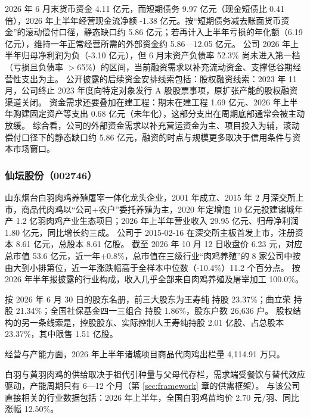  2026 年 6 月末货币资金 4.11 亿元，而短期债务 9.97 亿元（现金短债比 0.41 倍），2026 年上半年经营现金流净额 -1.38 亿元。按“短期债务减去账面货币资金”的滚动偿付口径，静态缺口约 5.86 亿元；若再计入上半年亏损的年化额（6.19 亿元），维持一年正常经营所需的外部资金约 5.86---12.05 亿元。 公司 2026 年上半年归母净利润为负（-3.10 亿元），但 6 月末资产负债率 52.3\% 尚未进入第一档（亏损且负债率 $>$65\%）的区间，当前融资需求以补充流动资金、支撑低谷期经营性支出为主。 公开披露的后续资金安排线索包括：股权融资线索：2023 年 11 月，公司终止 2023 年度向特定对象发行 A 股股票事项，原扩张产能的股权融资渠道关闭。 资金需求还要叠加在建工程：期末在建工程 1.69 亿元、2026 年上半年购建固定资产等支出 0.68 亿元（未年化），这部分支出在周期底部通常会被主动放缓。 综合看，公司的外部资金需求以补充营运资金为主、项目投入为辅，滚动偿付口径下的静态缺口约 5.86 亿元，融资的时点与规模更多取决于信用条件与资本市场窗口。




\subsubsection{仙坛股份（002746）}
\label{co:002746}

 山东烟台白羽肉鸡养殖屠宰一体化龙头企业，2001 年成立、2015 年 2 月深交所上市，商品代肉鸡以“公司+农户”委托养殖为主，2020 年定增逾 10 亿元投建诸城年产 1.2 亿羽肉鸡产业生态项目；2026 年上半年营业收入 29.95 亿元、归母净利润 1.80 亿元，同比增长约三成。 公司于 2015-02-16 在深交所主板首发上市，注册资本 8.61 亿元，总股本 8.61 亿股。 截至 2026 年 10 月 12 日收盘价 6.23 元，对应总市值 53.6 亿元，近一年+0.8\%，总市值在三级行业“肉鸡养殖”的 8 家公司中按由大到小排第位，近一年涨跌幅高于全样本中位数（-10.4\%）11.2 个百分点。 按 2026 年半年报披露的行业构成，收入几乎全部来自肉鸡养殖及屠宰加工 100.0\%。

 按 2026 年 6 月 30 日的股东名册，前三大股东为王寿纯 持股 23.37\%；曲立荣 持股 21.34\%；全国社保基金四一三组合 持股 1.86\%，股东户数 26,636 户。 股权结构的另一条线索是，控股股东、实际控制人王寿纯持股 2.01 亿股、占总股本 23.37\%，其中限售 1.51 亿股。

 经营与产能方面，2026 年上半年诸城项目商品代肉鸡出栏量 4,114.91 万只。

 白羽与黄羽肉鸡的供给取决于祖代引种量与父母代存栏，需求端受餐饮与替代效应驱动，产能周期只有 6---12 个月（第 \ref{sec:framework} 章的供需框架）。 与该公司直接相关的行业数据包括：2026 年上半年，全国白羽鸡苗均价 2.70 元/羽、同比涨幅 12.50\%。

